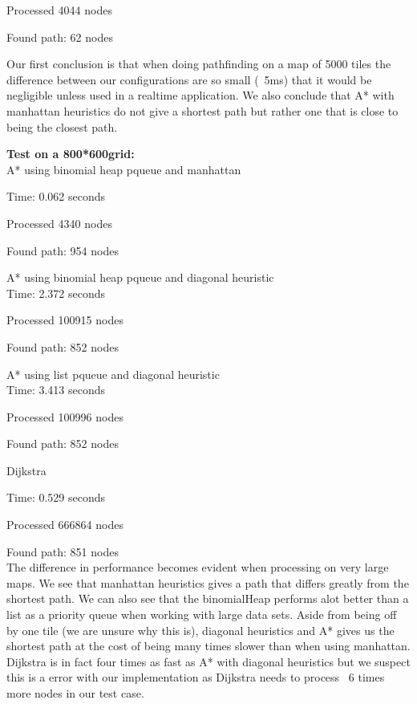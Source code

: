 \documentclass[12pt, a4paper]{article}
\begin{document}
Processed 4044 nodes

Found path: 62 nodes



Our first conclusion is that when doing pathfinding on a map of 5000 tiles
the difference between our configurations are so small (~5ms) that it would
be negligible unless used in a realtime application. We also conclude that
A* with manhattan heuristics do not give a shortest path but rather one
that is close to being the closest path.


\textbf{Test on a 800*600grid:}\\

A* using binomial heap pqueue and manhattan

Time: 0.062 seconds

Processed 4340 nodes

Found path: 954 nodes



A* using binomial heap pqueue and diagonal heuristic\\

Time: 2.372 seconds

Processed 100915 nodes

Found path: 852 nodes



A* using list pqueue and diagonal heuristic\\

Time: 3.413 seconds

Processed 100996 nodes

Found path: 852 nodes


Dijkstra

Time: 0.529 seconds

Processed 666864 nodes

Found path: 851 nodes\\



The difference in performance becomes evident when processing on very large
maps. We see that manhattan heuristics gives a path that differs greatly
from the shortest path. We can also see that the binomialHeap performs alot
better than a list as a priority queue when working with large data sets.
Aside from being off by one tile (we are unsure why this is), diagonal
heuristics and A* gives us the shortest path at the cost of being many
times slower than when using manhattan. Dijkstra is in fact four times as
fast as A* with diagonal heuristics but we suspect this is a error with our
implementation as Dijkstra needs to process ~6 times more nodes in our test
case.
\end{document}
